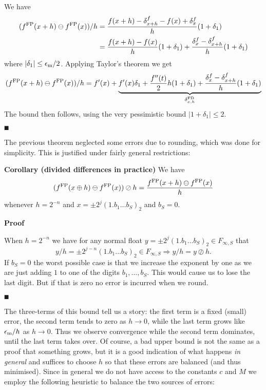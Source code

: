 We have
\begin{align*}
(f^{\rm FP}(x + h) \ensuremath{\ominus} f^{\rm FP}(x)) / h &= {f(x + h) -  \ensuremath{\delta}^f_{x+h} - f(x) + \ensuremath{\delta}^f_x \over h} (1 + \ensuremath{\delta}_1) \\
&= {f(x+h) - f(x) \over h} (1 + \ensuremath{\delta}_1) + { \ensuremath{\delta}^f_x - \ensuremath{\delta}^f_{x+h} \over h} (1 + \ensuremath{\delta}_1)
\end{align*}
where $|\ensuremath{\delta}_1| \ensuremath{\leq} {\ensuremath{\epsilon}_{\rm m} / 2}$. Applying Taylor's theorem we get
\[
(f^{\rm FP}(x + h) \ensuremath{\ominus} f^{\rm FP}(x)) / h = f'(x) + \underbrace{f'(x) \ensuremath{\delta}_1 + {f''(t) \over 2} h (1 + \delta_1) + {\ensuremath{\delta}^f_x  - \ensuremath{\delta}^f_{x+h}\over h} (1 + \ensuremath{\delta}_1)}_{\ensuremath{\delta}_{x,h}^{\rm FD}}
\]
The bound then follows, using the very pessimistic bound $|1 + \ensuremath{\delta}_1| \ensuremath{\leq} 2$.

\ensuremath{\QED}

The previous theorem neglected some errors due to rounding, which was done for simplicity. This is justified under fairly general restrictions:

\textbf{Corollary (divided differences in practice)} We have
\[
(f^{\rm FP}(x \ensuremath{\oplus} h) \ensuremath{\ominus} f^{\rm FP}(x)) \ensuremath{\oslash} h = {f^{\rm FP}(x + h) \ensuremath{\ominus} f^{\rm FP}(x) \over h}
\]
whenever  $h = 2^{-n}$ and $x = \ensuremath{\pm}2^j (1.b_1\ensuremath{\ldots}b_S)_2$ and $b_S = 0$.

\textbf{Proof}

When $h = 2^{-n}$ we have for any normal float $y = \ensuremath{\pm}2^j (1.b_1\ensuremath{\ldots}b_S)_2 \ensuremath{\in} F_{\ensuremath{\infty},S}$ that 
\[
y/h = \ensuremath{\pm}2^{j-n} (1.b_1\ensuremath{\ldots}b_S)_2 \ensuremath{\in} F_{\ensuremath{\infty},S} \ensuremath{\Rightarrow} y/h = y \ensuremath{\oslash} h.
\]
If $b_S = 0$ the worst possible case is that we increase the exponent by one as we are just adding $1$ to one of the digits $b_1,\ensuremath{\ldots},b_S$. This would cause us to lose the last digit. But if that is zero no error is incurred when we round.

\ensuremath{\QED}

The three-terms of this bound tell us a story: the first term is a fixed (small) error, the second term tends to zero as $h \rightarrow 0$, while the last term grows like $\ensuremath{\epsilon}_{\rm m}/h$ as $h \rightarrow 0$.  Thus we observe convergence while the second term dominates, until the last term takes over. Of course, a bad upper bound is not the same as a proof that something grows, but it is a good indication of what happens \emph{in general} and suffices to choose $h$ so that these errors are balanced (and thus minimised). Since in general we do not have access to the constants $c$ and $M$ we employ the following heuristic to balance the two sources of errors:

